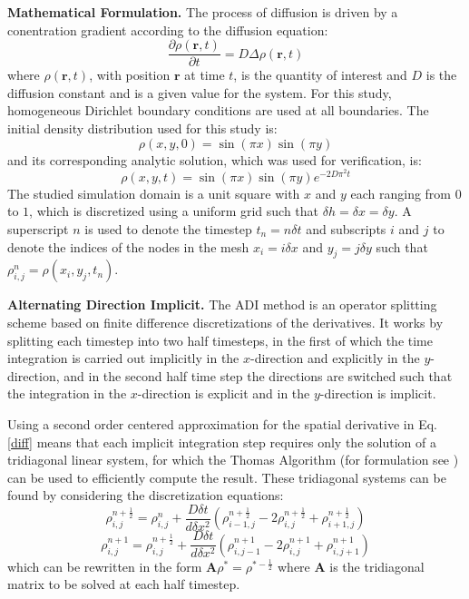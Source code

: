 \documentclass[letterpaper]{article}
\newcommand{\mypar}[1]{{\bf #1.}}
\begin{document}
\mypar{Mathematical Formulation}
The process of diffusion is driven by a conentration gradient according to the diffusion equation:
\begin{equation}
\frac{\partial \rho(\mathbf{r},t)}{\partial t} = D\Delta\rho(\mathbf{r},t)
\label{diff}
\end{equation}
where $\rho(\mathbf{r},t)$, with position $\mathbf{r}$ at time $t$, is the quantity of interest and $D$ is the diffusion constant and is a given value for the system. For this study, homogeneous Dirichlet boundary conditions are used at all boundaries. The initial density distribution used for this study is:
\begin{equation}
\rho(x,y,0)=\sin(\pi x)\sin(\pi y)
\end{equation}
and its corresponding analytic solution, which was used for verification, is:
\begin{equation}
\rho(x,y,t)=\sin(\pi x)\sin(\pi y)e^{-2D\pi^{2}t}
\label{analytic}
\end{equation}
The studied simulation domain is a unit square with $x$ and $y$ each ranging from $0$ to $1$, which is discretized using a uniform grid such that $\delta h=\delta x=\delta y$. A superscript $n$ is used to denote the timestep $t_n=n\delta t$ and subscripts $i$ and $j$ to denote the indices of the nodes in the mesh $x_i=i\delta x$ and $y_j=j\delta y$ such that $\rho_{i,j}^{n}=\rho(x_i,y_j,t_n)$.

\mypar{Alternating Direction Implicit}
The ADI method is an operator splitting scheme based on finite difference discretizations of the derivatives. It works by splitting each timestep into two half timesteps, in the first of which the time integration is carried out implicitly in the $x$-direction and explicitly in the $y$-direction, and in the second half time step the directions are switched such that the integration in the $x$-direction is explicit and in the $y$-direction is implicit.

Using a second order centered approximation for the spatial derivative in Eq. \eqref{diff} means that each implicit integration step requires only the solution of a tridiagonal linear system, for which the Thomas Algorithm (for formulation see \cite{thomas}) can be used to efficiently compute the result. These tridiagonal systems can be found by considering the discretization equations:
\begin{equation}
\rho_{i,j}^{n+\frac{1}{2}}=\rho_{i,j}^n+\frac{D\delta t}{d\delta x^2}(\rho_{i-1,j}^{n+\frac{1}{2}}-2\rho_{i,j}^{n+\frac{1}{2}}+\rho_{i+1,j}^{n+\frac{1}{2}})
\end{equation}
\begin{equation}
\rho_{i,j}^{n+1}=\rho_{i,j}^{n+\frac{1}{2}}+\frac{D\delta t}{d\delta x^2}(\rho_{i,j-1}^{n+1}-2\rho_{i,j}^{n+1}+\rho_{i,j+1}^{n+1})
\end{equation}
which can be rewritten in the form $\mathbf{A}\rho^*=\rho^{*-\frac{1}{2}}$ where $\mathbf{A}$ is the tridiagonal matrix to be solved at each half timestep.
\end{document}
